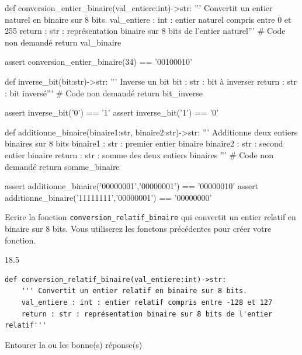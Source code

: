 \documentclass[a4paper,10pt]{report}
\def\ptsexoD{2}
\begin{document}
\begin{CodePythontexAlt}[Largeur=1\linewidth,Centre,PremLigne=1]{}
def conversion_entier_binaire(val_entiere:int)->str:
    ''' Convertit un entier naturel en binaire sur 8 bits. 
    val_entiere : int : entier naturel compris entre 0 et 255
    return : str : représentation binaire sur 8 bits de l'entier naturel'''
    # Code non demandé
    return val_binaire    

assert conversion_entier_binaire(34) == '00100010'

def inverse_bit(bit:str)->str:
    ''' Inverse un bit 
    bit : str : bit à inverser
    return : str : bit inversé'''
    # Code non demandé
    return bit_inverse

assert inverse_bit('0') == '1'
assert inverse_bit('1') == '0'

def additionne_binaire(binaire1:str, binaire2:str)->str:
    ''' Additionne deux entiers binaires sur 8 bits
    binaire1 : str : premier entier binaire
    binaire2 : str : second entier binaire
    return : str : somme des deux entiers binaires '''
    # Code non demandé
    return somme_binaire

assert additionne_binaire('00000001','00000001') == '00000010'
assert additionne_binaire('11111111','00000001') == '00000000'

\end{CodePythontexAlt}

Ecrire la fonction \texttt{conversion\_relatif\_binaire} qui convertit un entier relatif en binaire sur 8 bits. Vous utiliserez les fonctons précédentes pour créer votre fonction. 
    
    \begin{answer}{1}{8.5}
    \begin{verbatim}
def conversion_relatif_binaire(val_entiere:int)->str:
    ''' Convertit un entier relatif en binaire sur 8 bits. 
    val_entiere : int : entier relatif compris entre -128 et 127
    return : str : représentation binaire sur 8 bits de l'entier relatif'''
    \end{verbatim}
    \end{answer}


\exods{\ptsexoD}


Entourer la ou les bonne(s) réponse(s)
\end{document}

